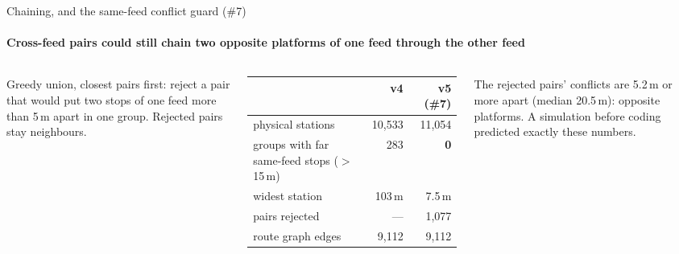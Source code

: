 \documentclass[aspectratio=169,10pt]{beamer}
\newcommand{\muted}[1]{{\color{cInkTwo}#1}}
\begin{document}
\begin{frame}{Chaining, and the same-feed conflict guard (\#7)}
  \framesubtitle{Cross-feed pairs could still chain two opposite platforms of one feed through the other feed}
  \begin{columns}[c]
    \centering
    \vskip0.2cm
    \scriptsize Greedy union, closest pairs first: reject a pair that would put two stops of one feed more than 5\,m
    apart in one group. Rejected pairs stay neighbours.
    \scriptsize
    \renewcommand{\arraystretch}{1.25}
    \begin{tabular}{@{}l r r@{}}
      \hline
      & \textbf{v4} & \textbf{v5 (\#7)} \\ \hline
      physical stations & 10,533 & 11,054 \\
      groups with far same-feed stops ($>$ 15\,m) & 283 & \textbf{0} \\
      widest station & 103\,m & 7.5\,m \\
      pairs rejected & --- & 1,077 \\
      route graph edges & 9,112 & 9,112 \\ \hline
    \end{tabular}
    \vskip0.2cm
    \muted{The rejected pairs' conflicts are 5.2\,m or more apart (median 20.5\,m): opposite platforms. A simulation
    before coding predicted exactly these numbers.}
  \end{columns}
\end{frame}
\end{document}
